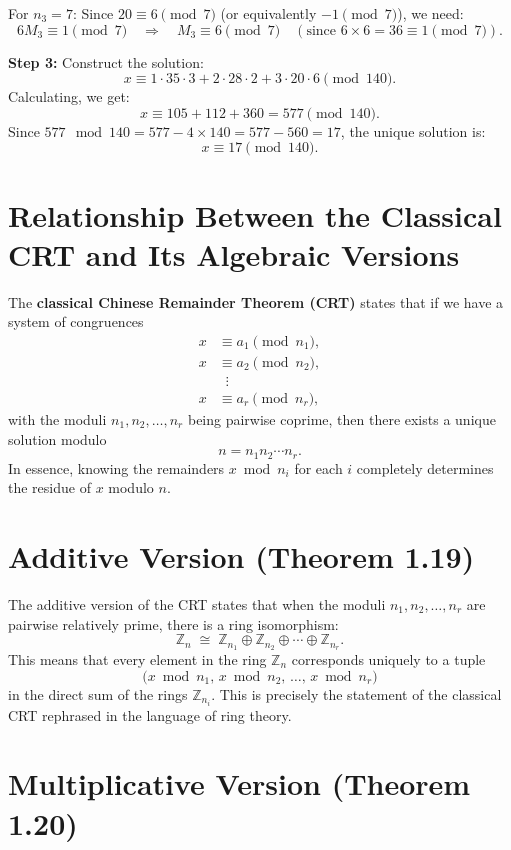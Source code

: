 \documentclass[12pt]{article}
\theoremstyle{definition} %
\theoremstyle{plain} %
\begin{document}
For \(n_3=7\): Since \(20 \equiv 6 \pmod{7}\) (or equivalently \(-1 \pmod{7}\)), we need:
\[
6M_3 \equiv 1 \pmod{7} \quad \Longrightarrow \quad M_3 \equiv 6 \pmod{7} \quad (\text{since } 6 \times 6 = 36 \equiv 1 \pmod{7}).
\]

\noindent\textbf{Step 3:} Construct the solution:
\[
x \equiv 1 \cdot 35 \cdot 3 + 2 \cdot 28 \cdot 2 + 3 \cdot 20 \cdot 6 \pmod{140}.
\]
Calculating, we get:
\[
x \equiv 105 + 112 + 360 = 577 \pmod{140}.
\]
Since \(577 \mod 140 = 577 - 4 \times 140 = 577 - 560 = 17\), the unique solution is:
\[
x \equiv 17 \pmod{140}.
\]
\section*{Relationship Between the Classical CRT and Its Algebraic Versions}

The \textbf{classical Chinese Remainder Theorem (CRT)} states that if we have a system of congruences
\[
\begin{aligned}
x &\equiv a_1 \pmod{n_1}, \\
x &\equiv a_2 \pmod{n_2}, \\
&\;\;\vdots \\
x &\equiv a_r \pmod{n_r},
\end{aligned}
\]
with the moduli \(n_1, n_2, \dots, n_r\) being pairwise coprime, then there exists a unique solution modulo 
\[
n = n_1 n_2 \cdots n_r.
\]
In essence, knowing the remainders \(x \bmod n_i\) for each \(i\) completely determines the residue of \(x\) modulo \(n\).

\section*{Additive Version (Theorem 1.19)}

The additive version of the CRT states that when the moduli \(n_1, n_2, \dots, n_r\) are pairwise relatively prime, there is a ring isomorphism:
\[
\mathbb{Z}_n \;\cong\; \mathbb{Z}_{n_1} \oplus \mathbb{Z}_{n_2} \oplus \cdots \oplus \mathbb{Z}_{n_r}.
\]
This means that every element in the ring \(\mathbb{Z}_n\) corresponds uniquely to a tuple
\[
\bigl(x \bmod n_1,\, x \bmod n_2,\, \dots,\, x \bmod n_r\bigr)
\]
in the direct sum of the rings \(\mathbb{Z}_{n_i}\). This is precisely the statement of the classical CRT rephrased in the language of ring theory.

\section*{Multiplicative Version (Theorem 1.20)}
\end{document}
